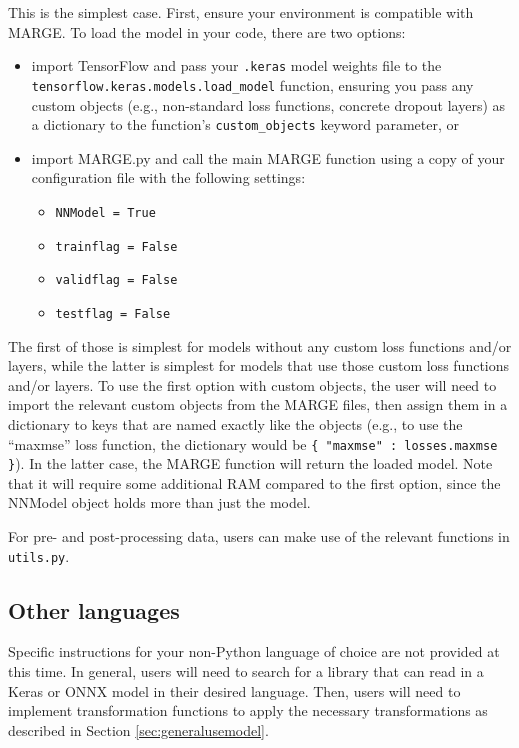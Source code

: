\documentclass[letterpaper, 12pt]{article}
\begin{document}
This is the simplest case.  First, ensure your environment is compatible with 
MARGE.  To load the model in your code, there are two options: 

\begin{itemize}
	\item import TensorFlow and pass your \texttt{.keras} model weights file to 
	    the \texttt{tensorflow.keras.models.load\_model} function, ensuring you 
	    pass any custom objects (e.g., non-standard loss functions, concrete 
	    dropout layers) as a dictionary to the function's 
	    \texttt{custom\_objects} keyword parameter, or
	\item import MARGE.py and call the main MARGE function using a copy of your 
	    configuration file with the following settings:
	    \begin{itemize}
	    	\item \texttt{NNModel = True}
	    	\item \texttt{trainflag = False}
	    	\item \texttt{validflag = False}
	    	\item \texttt{testflag = False}
	    \end{itemize}
\end{itemize}

\noindent The first of those is simplest for models without any custom loss 
functions and/or layers, while the latter is simplest for models that use those 
custom loss functions and/or layers.  To use the first option with custom 
objects, the user will need to import the relevant custom objects from the 
MARGE files, then assign them in a dictionary to keys that are named exactly 
like the objects (e.g., to use the ``maxmse'' loss function, the dictionary would 
be \texttt{\{ "maxmse" : losses.maxmse \}}).  In the latter case, the MARGE 
function will return the loaded model.  Note that it will require some 
additional RAM compared to the first option, since the NNModel object holds 
more than just the model. \newline

\noindent For pre- and post-processing data, users can make use of the relevant 
functions in \texttt{utils.py}.  

\subsection{Other languages}

Specific instructions for your non-Python language of choice are not provided 
at this time.  In general, users will need to search for a library that can read 
in a Keras or ONNX model in their desired language.  Then, users will need to 
implement transformation functions to apply the necessary transformations as 
described in Section \ref{sec:generalusemodel}. \newline
\end{document}
